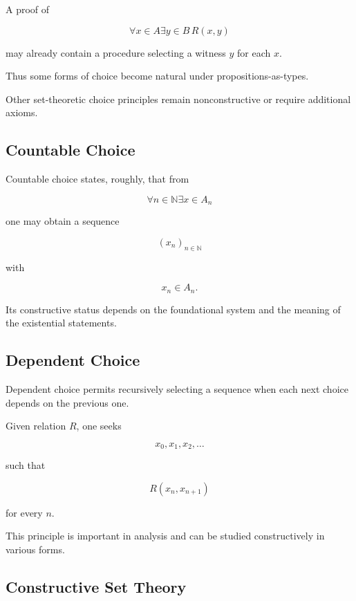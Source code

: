 A proof of

\[
\forall x\in A
\exists y\in B
\,
R(x,y)
\]

may already contain a procedure selecting a witness \(y\) for each \(x\).

Thus some forms of choice become natural under propositions-as-types.

Other set-theoretic choice principles remain nonconstructive or require
additional axioms.

\subsection{Countable Choice}
\label{subsec:countable-choice-constructive}

Countable choice states, roughly, that from

\[
\forall n\in\mathbb{N}
\exists x\in A_n
\]

one may obtain a sequence

\[
\boxed{
(x_n)_{n\in\mathbb{N}}
}
\]

with

\[
x_n\in A_n.
\]

Its constructive status depends on the foundational system and the meaning
of the existential statements.

\subsection{Dependent Choice}
\label{subsec:dependent-choice-constructive}

Dependent choice permits recursively selecting a sequence when each next
choice depends on the previous one.

Given relation \(R\), one seeks

\[
x_0,x_1,x_2,\ldots
\]

such that

\[
\boxed{
R(x_n,x_{n+1})
}
\]

for every \(n\).

This principle is important in analysis and can be studied constructively
in various forms.

\subsection{Constructive Set Theory}
\label{subsec:constructive-set-theory}


